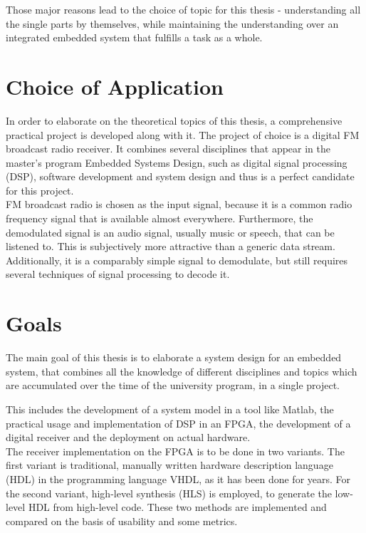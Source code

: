 Those major reasons lead to the choice of topic for this thesis - understanding all the single parts by themselves, while maintaining the understanding over an integrated embedded system that fulfills a task as a whole.

\section{Choice of Application}

In order to elaborate on the theoretical topics of this thesis, a comprehensive practical project is developed along with it.
The project of choice is a digital FM broadcast radio receiver.
It combines several disciplines that appear in the master's program Embedded Systems Design, such as digital signal processing (DSP), software development and system design and thus is a perfect candidate for this project.\\

FM broadcast radio is chosen as the input signal, because it is a common radio frequency signal that is available almost everywhere.
Furthermore, the demodulated signal is an audio signal, usually music or speech, that can be listened to.
This is subjectively more attractive than a generic data stream.
Additionally, it is a comparably simple signal to demodulate, but still requires several techniques of signal processing to decode it.

\section{Goals}

The main goal of this thesis is to elaborate a system design for an embedded system, that combines all the knowledge of different disciplines and topics which are accumulated over the time of the university program, in a single project.

This includes the development of a system model in a tool like Matlab, the practical usage and implementation of DSP in an FPGA, the development of a digital receiver and the deployment on actual hardware.\\

The receiver implementation on the FPGA is to be done in two variants.
The first variant is traditional, manually written hardware description language (HDL) in the programming language VHDL, as it has been done for years.
For the second variant, high-level synthesis (HLS) is employed, to generate the low-level HDL from high-level \cplusplus code.
These two methods are implemented and compared on the basis of usability and some metrics.

